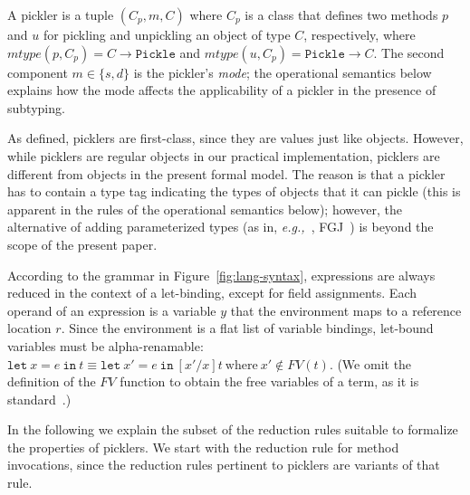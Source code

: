 \documentclass[preprint,10pt]{sigplanconf}
\theoremstyle{definition}
\theoremstyle{definition}
\newcommand{\eg}{{\em e.g.,~}}
\begin{document}
A pickler is a tuple $(C_p, m, C)$ where $C_p$ is a class that defines two
methods $p$ and $u$ for pickling and unpickling an object of type $C$,
respectively, where $mtype(p, C_p) = C \rightarrow \texttt{Pickle}$ and
$mtype(u, C_p) = \texttt{Pickle} \rightarrow C$.
The second component $m \in \{s, d\}$ is the pickler's {\em
mode}; the operational semantics below explains how the mode affects the
applicability of a pickler in the presence of subtyping.

As defined, picklers are first-class, since they are values just like objects.
However, while picklers are regular objects in our practical implementation,
picklers are different from objects in the present formal model. The reason is
that a pickler has to contain a type tag indicating the types of objects that
it can pickle (this is apparent in the rules of the operational semantics
below); however, the alternative of adding parameterized types (as in, \eg,
FGJ~\cite{Igarashi2001}) is beyond the scope of the present paper.

According to the grammar in Figure~\ref{fig:lang-syntax}, expressions are
always reduced in the context of a let-binding, except for ﬁeld assignments.
Each operand of an expression is a variable $y$ that the environment maps to a
reference location $r$. Since the environment is a ﬂat list of variable
bindings, let-bound variables must be alpha-renamable:
$\texttt{let}~x = e~\texttt{in}~t \equiv \texttt{let}~x' =
e~\texttt{in}~[x'/x]t~\text{where}~x' \notin FV(t)$. (We omit the
definition of the $FV$ function to obtain the free variables of a
term, as it is standard~\cite{TAPL}.)

In the following we explain the subset of the reduction rules suitable to
formalize the properties of picklers. We start with the reduction rule for
method invocations, since the reduction rules pertinent to picklers are
variants of that rule.
\end{document}
